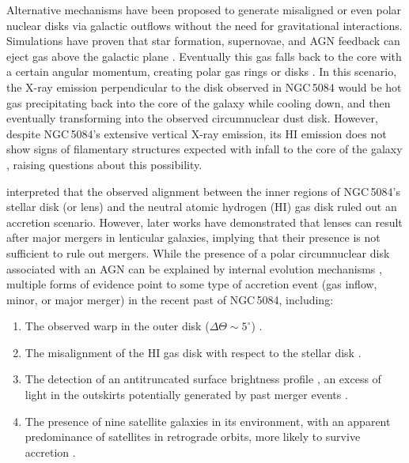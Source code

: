 \documentclass[modern]{aastex631}
\begin{document}
Alternative mechanisms have been proposed to generate misaligned or even polar nuclear disks via galactic outflows without the need for gravitational interactions. Simulations have proven that star formation, supernovae, and AGN feedback can eject gas above the galactic plane \citep{emsellem+2015mnras446_2468, renaud+2015mnras454_3299}. Eventually this gas falls back to the core with a certain angular momentum, creating polar gas rings or disks \citep{combes2017inproceedings_Di}. In this scenario, the X-ray emission perpendicular to the disk observed in NGC\,5084 would be hot gas precipitating back into the core of the galaxy while cooling down, and then eventually transforming into the observed circumnuclear dust disk. However, despite NGC\,5084's extensive vertical X-ray emission, its HI emission does not show signs of filamentary structures expected with infall to the core of the galaxy  \citep{zheng+2022afz22_085004}, raising questions about this possibility.

\citet{gottesman+1986mnras219_759} interpreted that the observed alignment between the inner regions of NGC\,5084's stellar disk (or lens) and the neutral atomic hydrogen (HI) gas disk ruled out an accretion scenario. However, later works \citep{elichemoral+2018aap617_113} have demonstrated that lenses can result after major mergers in lenticular galaxies, implying that their presence is not sufficient to rule out mergers. While the presence of a polar circumnuclear disk associated with an AGN can be explained by internal evolution mechanisms \citep[outflow gas cooling and subsequent precipitation onto the core,][]{combes2017inproceedings_Di}, multiple forms of evidence point to some type of accretion event (gas inflow, minor, or major merger) in the recent past of NGC\,5084, including:

\begin{enumerate}
\item The observed warp in the outer disk ($\Delta\Theta\sim5^{\circ}$) \citep{zeilinger+1990mnras246_324}.

\item The misalignment of the HI gas disk with respect to the stellar disk \citep{gottesman+1986mnras219_759,zheng+2022afz22_085004}.
\item The detection of an antitruncated surface brightness profile \citep{comeron+2012apj759_98}, an excess of light in the outskirts potentially generated by past merger events \citep{younger+2007apj670_269, borlaff+2014aap570_103}.

\item The presence of nine satellite galaxies in its environment, with an apparent predominance of satellites in retrograde orbits, more likely to survive accretion \citep[see Fig.\,\ref{fig:NGC5084_environment}]{carignan+1997aj113_1585}.

\end{enumerate}
\end{document}
